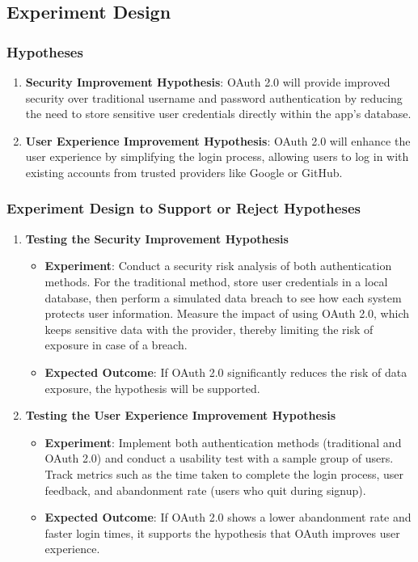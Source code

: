 \subsection{Experiment Design}

\subsubsection*{Hypotheses}

\begin{enumerate}
    \item \textbf{Security Improvement Hypothesis}: OAuth 2.0 will provide improved security over traditional username and password authentication by reducing the need to store sensitive user credentials directly within the app's database.

    \item \textbf{User Experience Improvement Hypothesis}: OAuth 2.0 will enhance the user experience by simplifying the login process, allowing users to log in with existing accounts from trusted providers like Google or GitHub.
\end{enumerate}

\subsubsection*{Experiment Design to Support or Reject Hypotheses}

\begin{enumerate}
    \item \textbf{Testing the Security Improvement Hypothesis}

    \begin{itemize}
        \item \textbf{Experiment}: Conduct a security risk analysis of both authentication methods. For the traditional method, store user credentials in a local database, then perform a simulated data breach to see how each system protects user information. Measure the impact of using OAuth 2.0, which keeps sensitive data with the provider, thereby limiting the risk of exposure in case of a breach.
        \item \textbf{Expected Outcome}: If OAuth 2.0 significantly reduces the risk of data exposure, the hypothesis will be supported.
    \end{itemize}

    \item \textbf{Testing the User Experience Improvement Hypothesis}

    \begin{itemize}
        \item \textbf{Experiment}: Implement both authentication methods (traditional and OAuth 2.0) and conduct a usability test with a sample group of users. Track metrics such as the time taken to complete the login process, user feedback, and abandonment rate (users who quit during signup).
        \item \textbf{Expected Outcome}: If OAuth 2.0 shows a lower abandonment rate and faster login times, it supports the hypothesis that OAuth improves user experience.
    \end{itemize}
\end{enumerate}

